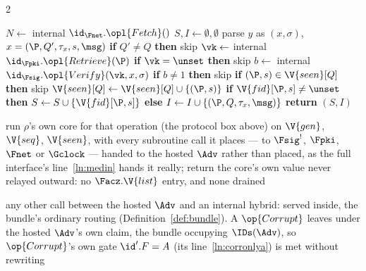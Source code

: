 \documentclass[10pt,oneside,openany]{book}
\theoremstyle{accentdef}
\theoremstyle{accentplain}
\begin{document}
\begin{interface}[nofloat]
{\begin{multicols}{2}
\begin{algorithmic}[1]
\algcont
\State $N \gets$ internal $\id_{\Fnet}.\opl{Fetch}()$
\State $S, I \gets \emptyset, \emptyset$
 \label{ln:simloop}
  \State parse $y$ as $(x,\sigma)$, \ $x = (\P,Q',\tau_x,s,\msg)$
  \State \textbf{if} $Q' \neq Q$ \textbf{then} skip
  \State $\vk \gets$ internal $\id_{\Fpki}.\opl{Retrieve}(\P)$
  \State \textbf{if} $\vk = \unset$ \textbf{then} skip
  \State $b \gets$ internal $\id_{\Fsig}.\opl{Verify}(\vk,x,\sigma)$
  \State \textbf{if} $b \neq 1$ \textbf{then} skip
  \State \textbf{if} $(\P,s) \in \V{seen}[Q]$ \textbf{then} skip \label{ln:simdedup}
  \State $\V{seen}[Q] \gets \V{seen}[Q] \cup \{(\P,s)\}$
  \State \textbf{if} $\V{fid}[\P,s] \neq \unset$
  \State \quad \textbf{then} $S \gets S \cup \{\V{fid}[\P,s]\}$ \label{ln:simhonest}
  \State \quad \textbf{else} $I \gets I \cup \{(\P,Q,\tau_x,\msg)\}$ \label{ln:siminject}
\EndFor
\State \textbf{return} $(S,I)$
\algsave
\end{algorithmic}
\vspace{1.4ex}

\begin{algorithmic}[1]
\algcont
\State run $\rho$'s own core for that operation (the protocol box above) on $\V{gen}$, $\V{seq}$,
  $\V{seen}$, with every subroutine call it places --- to $\Fsig^{!}$, $\Fpki$, $\Fnet$ or
  $\Gclock$ --- handed to the hosted $\Adv$ rather than placed, as the full interface's
  line~\ref{ln:medin} hands it really; return the core's own value \label{ln:simcorr}
\State never relayed outward: no $\Facz.\V{list}$ entry, and none drained
\algsave
\end{algorithmic}
\vspace{1.4ex}

\begin{algorithmic}[1]
\algcont
\State any other call between the hosted $\Adv$ and an internal hybrid: served inside, the
  bundle's ordinary routing (Definition~\ref{def:bundle}). A $\op{Corrupt}$ leaves under the
  hosted $\Adv$'s own claim, the bundle occupying $\IDs(\Adv)$, so $\op{Corrupt}$'s own gate
  $\id'.F = A$ (its line~\ref{ln:corronlya}) is met without rewriting
\algsave
\end{algorithmic}
\end{multicols}}
\end{interface}
\end{document}
